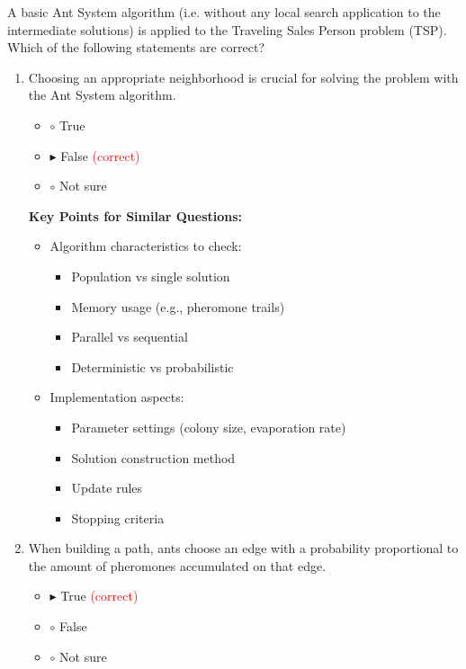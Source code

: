 A basic Ant System algorithm (i.e. without any local search application to the intermediate solutions) is applied to the Traveling Sales Person problem (TSP). Which of the following statements are correct?

\begin{enumerate}[label=\alph*)]
\item Choosing an appropriate neighborhood is crucial for solving the problem with the Ant System algorithm.
\begin{itemize}
\item $\circ$ True
\item $\blacktriangleright$ False \hspace{1em} \textcolor{red}{(correct)}
\item $\circ$ Not sure
\end{itemize}

\textbf{Key Points for Similar Questions:}
\begin{itemize}
\item Algorithm characteristics to check:
  \begin{itemize}
  \item Population vs single solution
  \item Memory usage (e.g., pheromone trails)
  \item Parallel vs sequential
  \item Deterministic vs probabilistic
  \end{itemize}
\item Implementation aspects:
  \begin{itemize}
  \item Parameter settings (colony size, evaporation rate)
  \item Solution construction method
  \item Update rules
  \item Stopping criteria
  \end{itemize}
\end{itemize}

\item When building a path, ants choose an edge with a probability proportional to the amount of pheromones accumulated on that edge.
\begin{itemize}
\item $\blacktriangleright$ True \hspace{1em} \textcolor{red}{(correct)}
\item $\circ$ False
\item $\circ$ Not sure
\end{itemize}


\end{enumerate}
